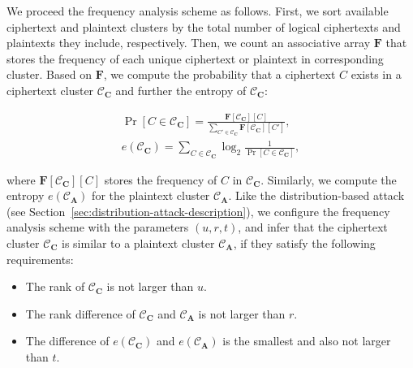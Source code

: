 We proceed the frequency analysis scheme as follows. First, we  sort available ciphertext and plaintext clusters by the total number of logical  ciphertexts and plaintexts they include, respectively. Then, we count an associative array $\mathbf{F}$ that stores the frequency of each unique ciphertext or plaintext in  corresponding cluster. Based on $\mathbf{F}$, we compute the probability that a  ciphertext $C$ exists in a ciphertext cluster $\mathcal{C}_\mathbf{C}$ and further the entropy of $\mathcal{C}_\mathbf{C}$:        

\begin{eqnarray*}
    \Pr[C \in \mathcal{C}_\mathbf{C}] = \frac{\mathbf{F}[\mathcal{C}_\mathbf{C}][C]}{\sum_{C' \in \mathcal{C}_\mathbf{C}} \mathbf{F}[\mathcal{C}_\mathbf{C}][C']}, \\
    e(\mathcal{C}_\mathbf{C}) = \sum_{C \in \mathcal{C}_\mathbf{C}} \log_2 \frac{1}{\Pr[C \in \mathcal{C}_\mathbf{C}]},  
\end{eqnarray*}

where $\mathbf{F}[\mathcal{C}_\mathbf{C}][C]$  stores the frequency of $C$ in $\mathcal{C}_\mathbf{C}$. Similarly, we  compute the entropy $e(\mathcal{C}_\mathbf{A})$ for the plaintext cluster $\mathcal{C}_\mathbf{A}$. Like the distribution-based attack (see Section~\ref{sec:distribution-attack-description}), we configure the frequency analysis scheme with the parameters $(u, r, t)$, and infer that the ciphertext cluster $\mathcal{C}_\mathbf{C}$ is similar to a plaintext cluster $\mathcal{C}_\mathbf{A}$, if they satisfy the following requirements:
  
\begin{itemize}[leftmargin=*]
    \item  The rank of $\mathcal{C}_\mathbf{C}$ is not larger than $u$.
    \item  The rank difference of $\mathcal{C}_\mathbf{C}$ and $\mathcal{C}_\mathbf{A}$ is not larger than $r$.  
    \item  The difference of $e(\mathcal{C}_\mathbf{C})$ and $e(\mathcal{C}_\mathbf{A})$ is the smallest and also not larger than $t$.
\end{itemize}


